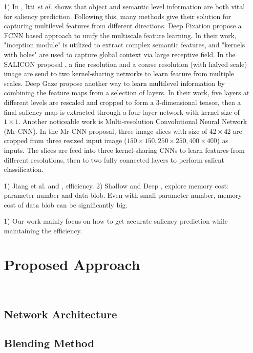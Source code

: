 \documentclass[twoside,twocolumn]{article}
\begin{document}
\par 1) In \cite{itti2001computational}, Itti \emph{et al.} shows that object and semantic level information are both vital for saliency prediction. Following this, many methods give their solution for capturing multilevel features from different directions. Deep Fixation \cite{kruthiventi2015deepfix} propose a FCNN based approach to unify the multiscale feature learning. In their work, "inception module" is utilized to extract complex semantic features, and "kernels with holes" are used to capture global context via large receptive field. In the SALICON proposal \cite{jiang2015salicon}, a fine resolution and a coarse resolution (with halved scale) image are send to two kernel-sharing networks to learn feature from multiple scales. Deep Gaze \cite{kummerer2014deep} propose another way to learn multilevel information by combining the feature maps from a selection of layers. In their work, five layers at different levels are rescaled and cropped to form a 3-dimensional tensor, then a final saliency map is extracted through a four-layer-network with kernel size of $1\times1$. Another noticeable work is Multi-resolution Convolutional Neural Network (Mr-CNN). In the Mr-CNN proposal, three image slices with size of $42\times42$ are cropped from three resized input image ($150\times150, 250\times250, 400\times400$) as inputs. The slices are feed into three kernel-sharing CNNs to learn features from different resolutions, then to two fully connected layers to perform salient classification.

\par 1) Jiang et al. and \cite{cbmmsaliency}, efficiency. 2) Shallow and Deep \cite{pan2016shallow}, explore memory cost: parameter number and data blob. Even with small parameter number, memory cost of data blob can be significantly big. 

\par 1) Our work mainly focus on how to get accurate saliency prediction while maintaining the efficiency.

\section{Proposed Approach}\

\subsection{Network Architecture}

\subsection{Blending Method}
\end{document}
